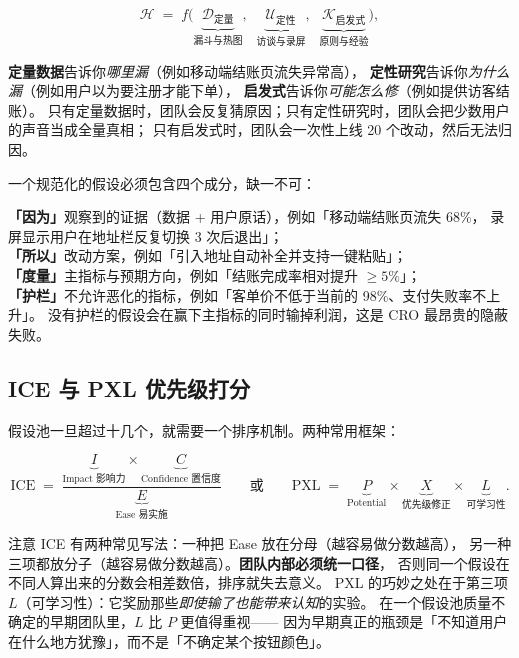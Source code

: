 \begin{equation}
\mathcal{H} \;=\; f\Big(\underbrace{\mathcal{D}_{\text{定量}}}_{\text{漏斗与热图}},\;\;
\underbrace{\mathcal{U}_{\text{定性}}}_{\text{访谈与录屏}},\;\;
\underbrace{\mathcal{K}_{\text{启发式}}}_{\text{原则与经验}}\Big) ,
\label{eq:hypothesis-sources}
\end{equation}

\textbf{定量数据}告诉你\emph{哪里漏}（例如移动端结账页流失异常高），
\textbf{定性研究}告诉你\emph{为什么漏}（例如用户以为要注册才能下单），
\textbf{启发式}告诉你\emph{可能怎么修}（例如提供访客结账）。
只有定量数据时，团队会反复猜原因；只有定性研究时，团队会把少数用户的声音当成全量真相；
只有启发式时，团队会一次性上线 20 个改动，然后无法归因。

一个规范化的假设必须包含四个成分，缺一不可：

\begin{keypoint}[假设的四要素模板：因为--所以--度量--护栏]
\textbf{「因为」}观察到的证据（数据 + 用户原话），例如「移动端结账页流失 68\%，
录屏显示用户在地址栏反复切换 3 次后退出」；\\
\textbf{「所以」}改动方案，例如「引入地址自动补全并支持一键粘贴」；\\
\textbf{「度量」}主指标与预期方向，例如「结账完成率相对提升 $\ge 5\%$」；\\
\textbf{「护栏」}不允许恶化的指标，例如「客单价不低于当前的 98\%、支付失败率不上升」。
没有护栏的假设会在赢下主指标的同时输掉利润，这是 CRO 最昂贵的隐蔽失败。
\end{keypoint}

\subsection{ICE 与 PXL 优先级打分}

假设池一旦超过十几个，就需要一个排序机制。两种常用框架：

\begin{equation}
\mathrm{ICE} \;=\; \frac{\underbrace{I}_{\text{Impact 影响力}} \times \underbrace{C}_{\text{Confidence 置信度}}}{\underbrace{E}_{\text{Ease 易实施}}}
\qquad\text{或}\qquad
\mathrm{PXL} \;=\; \underbrace{P}_{\text{Potential}} \times \underbrace{X}_{\text{优先级修正}} \times \underbrace{L}_{\text{可学习性}} .
\label{eq:ice-pxl}
\end{equation}

注意 ICE 有两种常见写法：一种把 Ease 放在分母（越容易做分数越高），
另一种三项都放分子（越容易做分数越高）。\textbf{团队内部必须统一口径}，
否则同一个假设在不同人算出来的分数会相差数倍，排序就失去意义。
PXL 的巧妙之处在于第三项 $L$（可学习性）：它奖励那些\emph{即使输了也能带来认知}的实验。
在一个假设池质量不确定的早期团队里，$L$ 比 $P$ 更值得重视——
因为早期真正的瓶颈是「不知道用户在什么地方犹豫」，而不是「不确定某个按钮颜色」。

